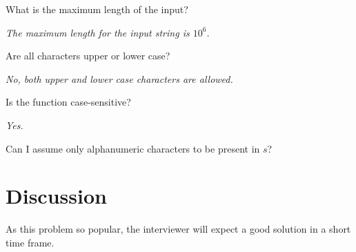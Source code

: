\begin{QandA}
	\item \begin{questionitem} \begin{question} What is the maximum length of the input?  \end{question} 	 
    \begin{answered}
		\textit{The maximum length for the input string is $10^6$.}
	\end{answered} \end{questionitem}
	
	\item \begin{questionitem} \begin{question} Are all characters upper or lower case?  \end{question} 	 
    \begin{answered}
		\textit{No, both upper and lower case characters are allowed.}
	\end{answered} \end{questionitem}

	\item \begin{questionitem} \begin{question} Is the function case-sensitive?  \end{question} 	 
    \begin{answered}
		\textit{Yes.}
	\end{answered} \end{questionitem}

	\item \begin{questionitem} \begin{question} Can I assume only alphanumeric characters to be present in $s$?  \end{question} 	 
     \end{questionitem}
\end{QandA}

\section{Discussion}
As this problem so popular, the interviewer will expect a good solution in a short time frame. 

